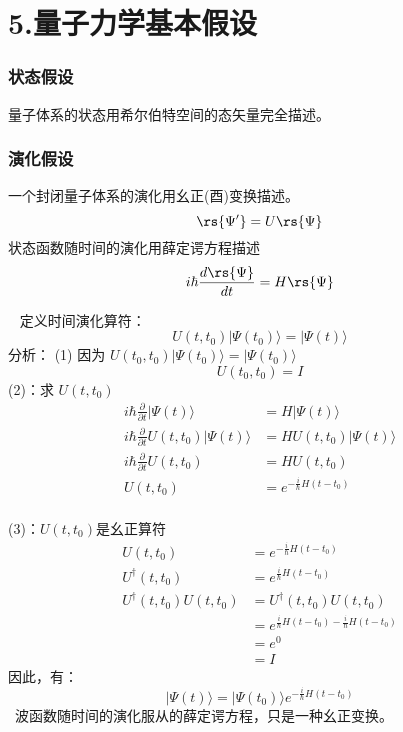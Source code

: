 \section{5.量子力学基本假设}

\begin{frame}
    \frametitle{状态假设}
    \begin{tcolorbox4}[1. 状态假设]
    量子体系的状态用希尔伯特空间的态矢量完全描述。
    \end{tcolorbox4}
\end{frame}

\begin{frame}
    \frametitle{演化假设}
    \begin{tcolorbox4}[2. 演化假设]
    一个封闭量子体系的演化用幺正(酉)变换描述。
    \[\rs{\Psi'}=U\rs{\Psi}\]
    状态函数随时间的演化用薛定谔方程描述
    \[ i\hbar \frac{d\rs{\Psi}}{dt}=H \rs{\Psi}\]
    \end{tcolorbox4}
\end{frame}

\begin{frame}
    \例[9. 试证明薛定谔方程与酉变换等价]{}
    \证~ 定义时间演化算符：
    $$ U(t,t_0) |\Psi(t_0)\rangle = |\Psi(t)\rangle  $$
    \alert{分析}：
    (1) 因为 $ U(t_0,t_0) |\Psi(t_0)\rangle = |\Psi(t_0)\rangle  $ \\
    $$ U(t_0,t_0)=I $$
    (2)：求 $ U(t,t_0)$
    $$ \begin{aligned}
        i\hbar \frac{\partial }{\partial t} |\Psi(t)\rangle &= H|\Psi(t)\rangle  \\
        i\hbar \frac{\partial }{\partial t}  U(t,t_0) |\Psi(t)\rangle &= H U(t,t_0) |\Psi(t)\rangle  \\
        i\hbar \frac{\partial }{\partial t}  U(t,t_0)  &= H U(t,t_0)  \\
        U(t,t_0)  &= e^{-\frac{i}{\hbar} H(t-t_0)}  \\
    \end{aligned} $$
\end{frame}

\begin{frame}  
    (3)：$ U(t,t_0)$是幺正算符
    $$ \begin{aligned}
        U(t,t_0)  &= e^{-\frac{i}{\hbar} H(t-t_0)}  \\
        U^\dagger (t,t_0)  &= e^{\frac{i}{\hbar} H(t-t_0)}  \\
        U^\dagger (t,t_0)U(t,t_0) &= U^\dagger (t,t_0)U(t,t_0) \\
         &=e^{\frac{i}{\hbar} H(t-t_0)-\frac{i}{\hbar} H(t-t_0)} \\
         &=e^0 \\
         &=I
    \end{aligned} $$
    因此，有：
    $$ |\Psi(t)\rangle = |\Psi(t_0)\rangle e^{-\frac{i}{\hbar}H(t-t_0)}   $$
    \Note ~波函数随时间的演化服从的薛定谔方程，只是一种幺正变换。
\end{frame} 


